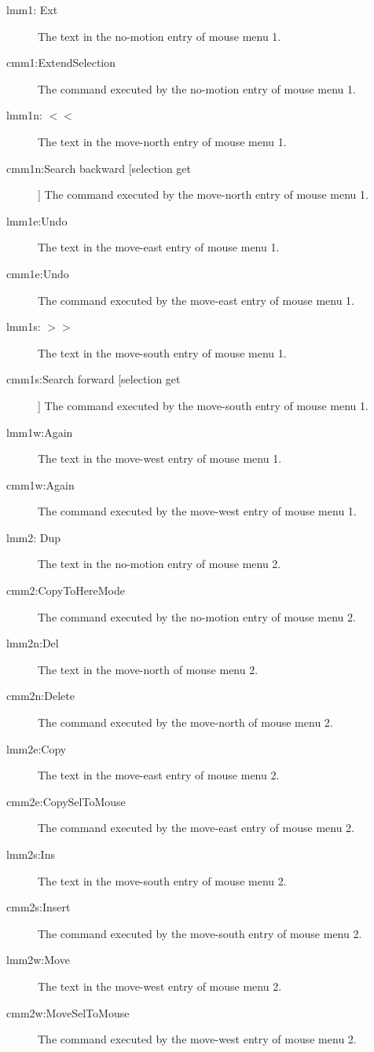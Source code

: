 \begin{description}

\item[lmm1: Ext]
The text in the no-motion entry of mouse menu 1.

\item[cmm1:ExtendSelection]
The command executed by the no-motion entry of mouse menu 1.

\item[lmm1n: $<<$]
The text in the move-north entry of mouse menu 1.

\item[cmm1n:Search backward [selection get]]
The command executed by the move-north entry of mouse menu 1.

\item[lmm1e:Undo]
The text in the move-east entry of mouse menu 1.

\item[cmm1e:Undo]
The command executed by the move-east entry of mouse menu 1.

\item[lmm1s: $>>$]
The text in the move-south entry of mouse menu 1.

\item[cmm1s:Search forward [selection get]]
The command executed by the move-south entry of mouse menu 1.

\item[lmm1w:Again]
The text in the move-west entry of mouse menu 1.

\item[cmm1w:Again]
The command executed by the move-west entry of mouse menu 1.

\item[lmm2: Dup]
The text in the no-motion entry of mouse menu 2.

\item[cmm2:CopyToHereMode]
The command executed by the no-motion entry of mouse menu 2.

\item[lmm2n:Del ]
The text in the move-north of mouse menu 2.

\item[cmm2n:Delete]
The command executed by the move-north of mouse menu 2.

\item[lmm2e:Copy]
The text in the move-east entry of mouse menu 2.

\item[cmm2e:CopySelToMouse]
The command executed by the move-east entry of mouse menu 2.

\item[lmm2s:Ins ]
The text in the move-south entry of mouse menu 2.

\item[cmm2s:Insert]
The command executed by the move-south entry of mouse menu 2.

\item[lmm2w:Move]
The text in the move-west entry of mouse menu 2.

\item[cmm2w:MoveSelToMouse]
The command executed by the move-west entry of mouse menu 2.

\end{description}
